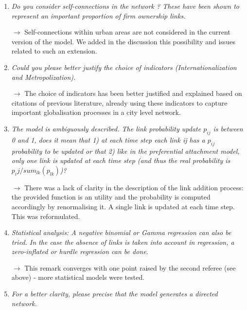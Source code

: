 \documentclass[10pt,a4paper,sans]{moderncv}
\begin{document}
\begin{enumerate}
	\item \textit{Do you consider self-connections in the network ? These have been shown to represent an important proportion of firm ownership links.}
	
	$\rightarrow$ Self-connections within urban areas are not considered in the current version of the model. We added in the discussion this possibility and issues related to such an extension.
	
	\medskip
	
	\item \textit{Could you please better justify the choice of indicators (Internationalization and Metropolization).}
	
	$\rightarrow$ The choice of indicators has been better justified and explained based on citations of previous literature, already using these indicators to capture important globalisation processes in a city level network.
	
	\medskip



	\item \textit{The model is ambiguously described. The link probability update $p_{ij}$ is between 0 and 1, does it mean that 1) at each time step each link ij has a $p_{ij}$ probability to be updated or that 2) like in the preferential attachment model, only one link is updated at each time step (and thus the real probability is $p_ij/sum_{lk}(p_{lk})$)?}
	
	$\rightarrow$ There was a lack of clarity in the description of the link addition process: the provided function is an utility and the probability is computed accordingly by renormalising it. A single link is updated at each time step. This was reformulated.
	
	\medskip


	\item \textit{Statistical analysis: A negative binomial or Gamma regression can also be tried. In the case the absence of links is taken into account in regression, a zero-inflated or hurdle regression can be done.}
	 
	$\rightarrow$ This remark converges with one point raised by the second referee (see above) - more statistical models were tested.
	
	\medskip


	\item \textit{For a better clarity, please precise that the model generates a directed network.}


\end{enumerate}
\end{document}
